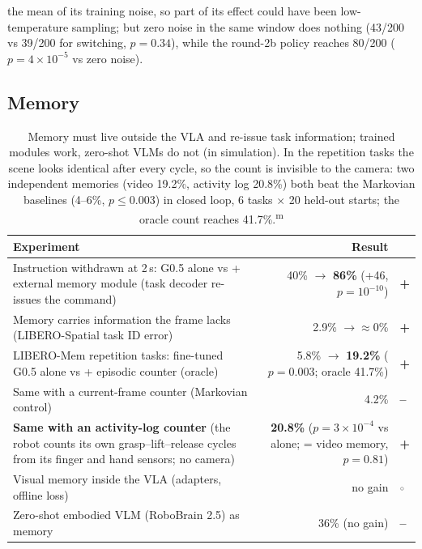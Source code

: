 \documentclass[10pt,a4paper]{article}
\DeclareRobustCommand{\meas}{\textsuperscript{\textcolor{green!50!black}{m}}}
\newcommand{\pos}{\textcolor{green!45!black}{\textbf{+}}}
\newcommand{\negr}{\textcolor{red!70!black}{\textbf{--}}}
\newcommand{\neu}{\textcolor{gray}{$\circ$}}
\begin{document}
the mean of its training noise, so part of its effect could have been low-temperature sampling; but zero noise in the same window does nothing (43/200 vs 39/200 for switching, $p=0.34$), while the round-2b policy reaches 80/200 ($p=4\times10^{-5}$ vs zero noise).

\subsection{Memory}
\begin{table}[H]\centering\small
\begin{tabularx}{\textwidth}{Yrl}
\toprule
Experiment & Result & \\
\midrule
Instruction withdrawn at 2\,s: G0.5 alone vs + external memory module (task decoder re-issues the command) & 40\% $\rightarrow$ \textbf{86\%} (+46, $p=10^{-10}$) & \pos\\
Memory carries information the frame lacks (LIBERO-Spatial task ID error) & 2.9\% $\rightarrow\approx$0\% & \pos\\
LIBERO-Mem repetition tasks: fine-tuned G0.5 alone vs + episodic counter (oracle) & 5.8\% $\rightarrow$ \textbf{19.2\%} ($p=0.003$; oracle 41.7\%) & \pos\\
Same with a current-frame counter (Markovian control) & 4.2\% & \negr\\
\textbf{Same with an activity-log counter} (the robot counts its own grasp--lift--release cycles from its finger and hand sensors; no camera) & \textbf{20.8\%} ($p=3\times10^{-4}$ vs alone; = video memory, $p=0.81$) & \pos\\
Visual memory inside the VLA (adapters, offline loss) & no gain & \neu\\
Zero-shot embodied VLM (RoboBrain 2.5) as memory & 36\% (no gain) & \negr\\
\bottomrule
\end{tabularx}
\caption{Memory must live outside the VLA and re-issue task information; trained modules work, zero-shot VLMs do not (in simulation). In the repetition tasks the scene looks identical after every cycle, so the count is invisible to the camera: two independent memories (video 19.2\%, activity log 20.8\%) both beat the Markovian baselines (4--6\%, $p\le0.003$) in closed loop, 6 tasks $\times$ 20 held-out starts; the oracle count reaches 41.7\%.\meas}
\end{table}
\end{document}
